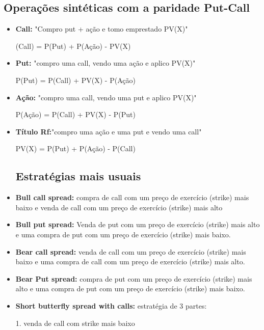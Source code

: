 \documentclass{sciposter}
\begin{document}
\begin{multicols}{3}
\subsection*{\textbf{Operações sintéticas com a paridade Put-Call}}
\begin{itemize}
    \item \textbf{Call:}  "Compro put + ação e tomo emprestado PV(X)"
    \begin{center}
    (Call) = P(Put) + P(Ação) - PV(X)  
    \end{center}
    \item \textbf{Put:} "compro uma call, vendo uma ação e aplico PV(X)"
    \begin{center}
P(Put) = P(Call) + PV(X) - P(Ação) 
    \end{center}
    \item \textbf{Ação:} "compro uma call, vendo uma put e aplico PV(X)"
    \begin{center}
P(Ação) = P(Call) + PV(X) - P(Put)  
    \end{center}
    \item \textbf{Título Rf:}"compro uma ação e uma put e vendo uma call"
    \begin{center}
PV(X) = P(Put) + P(Ação) - P(Call)
    \end{center}

\vspace{0.75 cm}
\subsection*{\textbf{Estratégias mais usuais}}
\item \textbf{Bull call spread:} compra de call com um preço de exercício (strike) mais baixo e venda de call com um preço de exercício (strike) mais alto 
\item \textbf{Bull put spread:} Venda de put com um preço de exercício (strike) mais alto e uma compra de put com um preço de exercício (strike) mais baixo.
\item \textbf{Bear call spread:} venda de call com um preço de exercício (strike) mais baixo e uma compra de call com um preço de exercício (strike) mais alto. 
\item \textbf{Bear Put spread:} compra de put com um preço de exercício (strike) mais alto e uma compra de put com um preço de exercício (strike) mais baixo. 
\item \textbf{Short butterfly spread with calls:} estratégia de 3 partes:

1. venda de call com strike mais baixo


\end{itemize}
\end{multicols}
\end{document}
